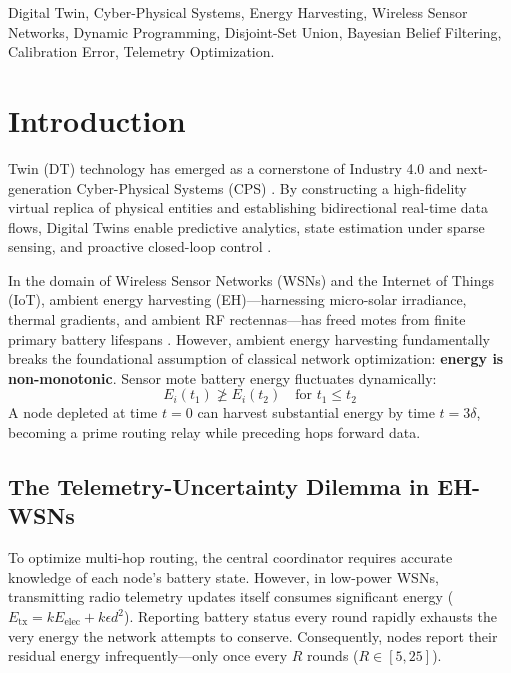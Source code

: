 \documentclass[journal]{IEEEtran}
\begin{document}
\begin{IEEEkeywords}
Digital Twin, Cyber-Physical Systems, Energy Harvesting, Wireless Sensor Networks, Dynamic Programming, Disjoint-Set Union, Bayesian Belief Filtering, Calibration Error, Telemetry Optimization.
\end{IEEEkeywords}

\section{Introduction}

 Twin (DT) technology has emerged as a cornerstone of Industry 4.0 and next-generation Cyber-Physical Systems (CPS) \cite{tao2019digital, fuller2020digital}. By constructing a high-fidelity virtual replica of physical entities and establishing bidirectional real-time data flows, Digital Twins enable predictive analytics, state estimation under sparse sensing, and proactive closed-loop control \cite{grieves2017digital, almasan2022digital}.

In the domain of Wireless Sensor Networks (WSNs) and the Internet of Things (IoT), ambient energy harvesting (EH)—harnessing micro-solar irradiance, thermal gradients, and ambient RF rectennas—has freed motes from finite primary battery lifespans \cite{sah2020renewable, sudevalayam2011energy}. However, ambient energy harvesting fundamentally breaks the foundational assumption of classical network optimization: \textbf{energy is non-monotonic}. Sensor mote battery energy fluctuates dynamically:
\begin{equation}
E_i(t_1) \not\ge E_i(t_2) \quad \text{for } t_1 \le t_2
\end{equation}
A node depleted at time $t=0$ can harvest substantial energy by time $t=3\delta$, becoming a prime routing relay while preceding hops forward data.

\subsection{The Telemetry-Uncertainty Dilemma in EH-WSNs}
To optimize multi-hop routing, the central coordinator requires accurate knowledge of each node's battery state. However, in low-power WSNs, transmitting radio telemetry updates itself consumes significant energy ($E_{\text{tx}} = k E_{\text{elec}} + k \epsilon d^2$). Reporting battery status every round rapidly exhausts the very energy the network attempts to conserve. Consequently, nodes report their residual energy infrequently—only once every $R$ rounds ($R \in [5, 25]$).
\end{document}
